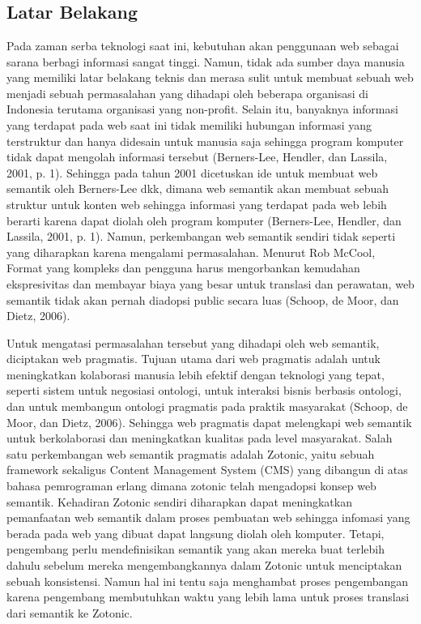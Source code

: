 \chapter{\babSatu}


\section{Latar Belakang}

Pada zaman serba teknologi saat ini, kebutuhan akan penggunaan web sebagai sarana berbagi informasi sangat tinggi. Namun, tidak ada sumber daya manusia yang memiliki latar belakang teknis dan merasa sulit untuk membuat sebuah web menjadi sebuah permasalahan yang dihadapi oleh beberapa organisasi di Indonesia terutama organisasi yang non-profit. Selain itu, banyaknya informasi yang terdapat pada web saat ini tidak memiliki hubungan informasi yang terstruktur dan hanya didesain untuk manusia saja sehingga program komputer tidak dapat mengolah informasi tersebut (Berners-Lee, Hendler, dan Lassila, 2001, p. 1). 
Sehingga pada tahun 2001 dicetuskan ide untuk membuat web semantik oleh Berners-Lee dkk, dimana web semantik akan membuat sebuah struktur untuk konten web sehingga informasi yang terdapat pada web lebih berarti karena dapat diolah oleh program komputer (Berners-Lee, Hendler, dan Lassila, 2001, p. 1). Namun, perkembangan web semantik sendiri tidak seperti yang diharapkan karena mengalami permasalahan. Menurut Rob McCool, Format yang kompleks dan pengguna harus mengorbankan kemudahan ekspresivitas dan membayar biaya yang besar untuk translasi dan perawatan, web semantik tidak akan pernah diadopsi public secara luas (Schoop, de Moor, dan Dietz, 2006).

Untuk mengatasi permasalahan tersebut yang dihadapi oleh web semantik, diciptakan web pragmatis. Tujuan utama dari web pragmatis adalah untuk meningkatkan kolaborasi manusia lebih efektif dengan teknologi yang tepat, seperti sistem untuk negosiasi ontologi, untuk interaksi bisnis berbasis ontologi, dan untuk membangun ontologi pragmatis pada praktik masyarakat (Schoop, de Moor, dan Dietz, 2006). Sehingga web pragmatis dapat melengkapi web semantik untuk berkolaborasi dan meningkatkan kualitas pada level masyarakat. Salah satu perkembangan web semantik pragmatis adalah Zotonic, yaitu sebuah framework sekaligus Content Management System (CMS) yang dibangun di atas bahasa pemrograman erlang dimana zotonic telah mengadopsi konsep web semantik. Kehadiran Zotonic sendiri diharapkan dapat meningkatkan pemanfaatan web semantik dalam proses pembuatan web sehingga infomasi yang berada pada web yang dibuat dapat langsung diolah oleh komputer. Tetapi, pengembang perlu mendefinisikan semantik yang akan mereka buat terlebih dahulu sebelum mereka mengembangkannya dalam Zotonic untuk menciptakan sebuah konsistensi. Namun hal ini tentu saja menghambat proses pengembangan karena pengembang membutuhkan waktu yang lebih lama untuk proses translasi dari semantik ke Zotonic.

